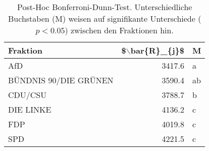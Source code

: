 \begin{table}[ht]
\centering
\begin{tabular}{lrl}
  \hline
Fraktion & \$$\backslash$bar\{R\}\_\{j\}\$ & M \\ 
  \hline
AfD & 3417.6 & a \\ 
  BÜNDNIS 90/DIE GRÜNEN & 3590.4 & ab \\ 
  CDU/CSU & 3788.7 & b \\ 
  DIE LINKE & 4136.2 & c \\ 
  FDP & 4019.8 & c \\ 
  SPD & 4221.5 & c \\ 
   \hline
\end{tabular}
\caption[Post-Hoc Bonferroni-Dunn-Test]{Post-Hoc Bonferroni-Dunn-Test. Unterschiedliche Buchstaben (M) 
weisen auf signifikante Unterschiede ($p < 0.05$) zwischen den Fraktionen hin.} 
\label{tab:dunn-test}
\end{table}
